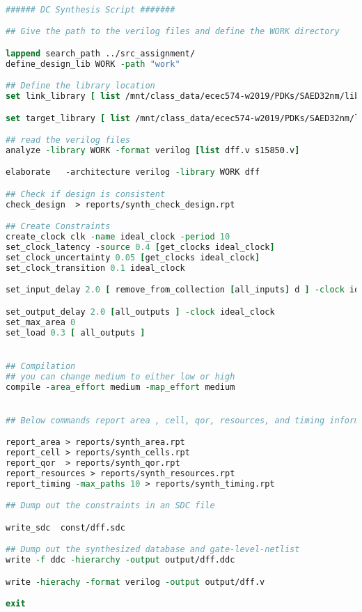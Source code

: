\documentclass[letterpaper, 11pt]{article}
\begin{document}
\begin{lstlisting}[language=tcl]

###### DC Synthesis Script #######

## Give the path to the verilog files and define the WORK directory

lappend search_path ../src_assignment/
define_design_lib WORK -path "work"

## Define the library location
set link_library [ list /mnt/class_data/ecec574-w2019/PDKs/SAED32nm/lib/stdcell_rvt/db_ccs/saed32rvt_ss0p95v125c.db /mnt/class_data/ecec574-w2019/PDKs/SAED32nm/lib/stdcell_rvt/db_ccs/saed32rvt_ss0p95v25c.db /mnt/class_data/ecec574-w2019/PDKs/SAED32nm/lib/stdcell_rvt/db_ccs/saed32rvt_ss0p95vn40c.db]

set target_library [ list /mnt/class_data/ecec574-w2019/PDKs/SAED32nm/lib/stdcell_rvt/db_ccs/saed32rvt_ss0p95v25c.db ]

## read the verilog files
analyze -library WORK -format verilog [list dff.v s15850.v]

elaborate   -architecture verilog -library WORK dff

## Check if design is consistent
check_design  > reports/synth_check_design.rpt

## Create Constraints 
create_clock clk -name ideal_clock -period 10
set_clock_latency -source 0.4 [get_clocks ideal_clock]
set_clock_uncertainty 0.05 [get_clocks ideal_clock]
set_clock_transition 0.1 ideal_clock

set_input_delay 2.0 [ remove_from_collection [all_inputs] d ] -clock ideal_clock

set_output_delay 2.0 [all_outputs ] -clock ideal_clock
set_max_area 0
set_load 0.3 [ all_outputs ]


## Compilation 
## you can change medium to either low or high 
compile -area_effort medium -map_effort medium


## Below commands report area , cell, qor, resources, and timing information needed to analyze the design. 

report_area > reports/synth_area.rpt
report_cell > reports/synth_cells.rpt
report_qor  > reports/synth_qor.rpt
report_resources > reports/synth_resources.rpt
report_timing -max_paths 10 > reports/synth_timing.rpt

## Dump out the constraints in an SDC file

write_sdc  const/dff.sdc

## Dump out the synthesized database and gate-level-netlist
write -f ddc -hierarchy -output output/dff.ddc

write -hierachy -format verilog -output output/dff.v

exit

\end{lstlisting}
\end{document}
